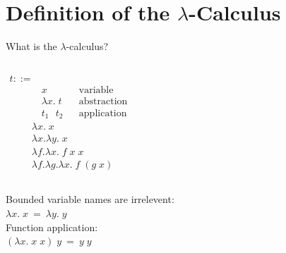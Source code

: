 \documentclass[xcolor=dvipsnames]{beamer}
\begin{document}

\section{Definition of the $\lambda$-Calculus}

\begin{frame}{What is the $\lambda$-calculus?}
  \begin{columns}[c]
      \begin{align*}
        t ::= & \\
          & x && \text{variable} \\
          & \lambda x. \; t && \text{abstraction} \\
          & t_1 \text{ } t_2 && \text{application}
      \end{align*}
      \begin{align*}
        & \lambda x. \; x \\
        & \lambda x. \lambda y. \; x \\
        & \lambda f. \lambda x. \; f \; x \; x \\
        & \lambda f. \lambda g. \lambda x. \; f \; (g \; x)
      \end{align*}
  \end{columns}
  \vspace{20pt}
  \begin{center}
    Bounded variable names are irrelevent: \\
    $\lambda x. \; x \: = \: \lambda y. \; y$ \\
    \vspace{20pt}
    Function application: \\
    $(\lambda x. \; x \; x) \; y \: = \: y \; y$
  \end{center}
\end{frame}
\end{document}
